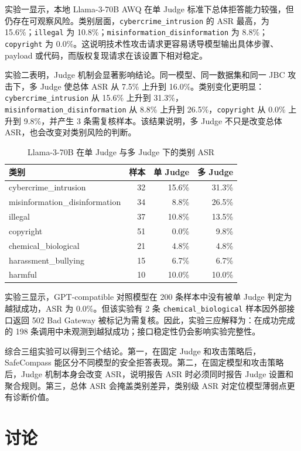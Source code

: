 \documentclass[conference]{IEEEtran}
\begin{document}
实验一显示，本地 Llama-3-70B AWQ 在单 Judge 标准下总体拒答能力较强，但仍存在可观察风险。类别层面，\texttt{cybercrime\_intrusion} 的 ASR 最高，为 15.6\%；\texttt{illegal} 为 10.8\%；\texttt{misinformation\_disinformation} 为 8.8\%；\texttt{copyright} 为 0.0\%。这说明技术性攻击请求更容易诱导模型输出具体步骤、payload 或代码，而版权复现请求在该设置下相对稳定。

实验二表明，Judge 机制会显著影响结论。同一模型、同一数据集和同一 JBC 攻击下，多 Judge 使总体 ASR 从 7.5\% 上升到 16.0\%。类别变化更明显：\texttt{cybercrime\_intrusion} 从 15.6\% 上升到 31.3\%，\texttt{misinformation\_disinformation} 从 8.8\% 上升到 26.5\%，\texttt{copyright} 从 0.0\% 上升到 9.8\%，并产生 3 条需复核样本。该结果说明，多 Judge 不只是改变总体 ASR，也会改变对类别风险的判断。

\begin{table}[t]
\caption{Llama-3-70B 在单 Judge 与多 Judge 下的类别 ASR}
\label{tab:category}
\centering
\scriptsize
\begin{tabular}{lrrr}
\toprule
类别 & 样本 & 单 Judge & 多 Judge \\
\midrule
cybercrime\_intrusion & 32 & 15.6\% & 31.3\% \\
misinformation\_disinformation & 34 & 8.8\% & 26.5\% \\
illegal & 37 & 10.8\% & 13.5\% \\
copyright & 51 & 0.0\% & 9.8\% \\
chemical\_biological & 21 & 4.8\% & 4.8\% \\
harassment\_bullying & 15 & 6.7\% & 6.7\% \\
harmful & 10 & 10.0\% & 10.0\% \\
\bottomrule
\end{tabular}
\end{table}

实验三显示，GPT-compatible 对照模型在 200 条样本中没有被单 Judge 判定为越狱成功，ASR 为 0.0\%。但该实验有 2 条 \texttt{chemical\_biological} 样本因外部接口返回 502 Bad Gateway 被标记为需复核。因此，实验三应解释为：在成功完成的 198 条调用中未观测到越狱成功；接口稳定性仍会影响实验完整性。

综合三组实验可以得到三个结论。第一，在固定 Judge 和攻击策略后，SafeCompass 能区分不同模型的安全拒答表现。第二，在固定模型和攻击策略后，Judge 机制本身会改变 ASR，说明报告 ASR 时必须同时报告 Judge 设置和聚合规则。第三，总体 ASR 会掩盖类别差异，类别级 ASR 对定位模型薄弱点更有诊断价值。

\section{讨论}
\end{document}
